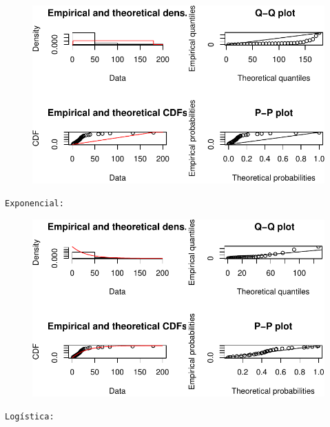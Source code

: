 \documentclass[
  letterpaper,
  DIV=11,
  numbers=noendperiod]{scrartcl}
\begin{document}
\begin{figure}[H]

{\centering \includegraphics{quiz5_files/figure-pdf/unnamed-chunk-35-7.pdf}

}

\end{figure}

\begin{verbatim}
Exponencial: 
\end{verbatim}

\begin{figure}[H]

{\centering \includegraphics{quiz5_files/figure-pdf/unnamed-chunk-35-8.pdf}

}

\end{figure}

\begin{verbatim}
Logística: 
\end{verbatim}
\end{document}

